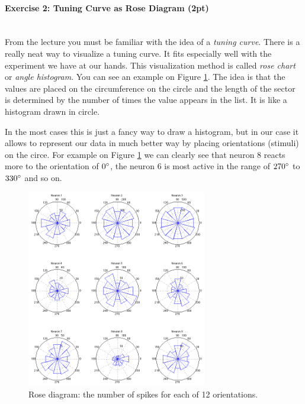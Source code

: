 \documentclass[a4paper,11pt]{article}
\newenvironment{exercise}[3]{\paragraph{Exercise #1: #2 (#3pt)}\ \\}{
\medskip}
\begin{document}
\begin{exercise}{2}{Tuning Curve as Rose Diagram}{2}
From the lecture you must be familiar with the idea of a \emph{tuning curve}. There is a really neat way to visualize a tuning curve. It fits especially well with the experiment we have at our hands. This visualization method is called \emph{rose chart} or \emph{angle histogram}. You can see an example on Figure \ref{fig:rosediag}. The idea is that the values are placed on the circumference on the circle and the length of the sector is determined by the number of times the value appears in the list. It is like a histogram drawn in circle.

In the most cases this is just a fancy way to draw a histogram, but in our case it allows to represent our data in much better way by placing orientations (stimuli) on the circe. For example on Figure \ref{fig:rosediag} we can clearly see that neuron 8 reacts more to the orientation of $0\degree$, the neuron 6 is most active in the range of $270\degree$ to $330\degree$ and so on.

\begin{figure}[H]
   \centering
   \includegraphics[width=0.7\textwidth]{rosediag.png} 
   \caption{Rose diagram: the number of spikes for each of 12 orientations.}
   \label{fig:rosediag}
\end{figure}


\end{exercise}
\end{document}
